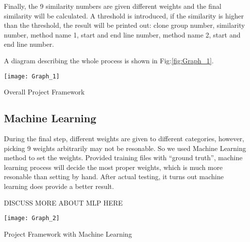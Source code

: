 \documentclass[../main.tex]{subfiles}
\begin{document}
Finally, the 9 similarity numbers are given different weights and the final similarity will be calculated. A threshold is introduced, if the similarity is higher than the threshold, the result will be printed out: clone group number, similarity number, method name 1, start and end line number, method name 2, start and end line number.

A diagram describing the whole process is shown in Fig:\ref{fig:Graph_1}.\\

\begin{figurehere}
\centering \texttt{[image: Graph\_1]} 
\caption{Overall Project Framework} \label{fig:Graph_1}
\end{figurehere}

\subsection{Machine Learning}

During the final step, different weights are given to different categories, however, picking 9 weights arbitrarily may not be resonable. So we used Machine Learning method to set the weights. Provided training files with ``ground truth'', machine learning process will decide the most proper weights, which is much more resonable than setting by hand. After actual testing, it turns out machine learning does provide a better result.

DISCUSS MORE ABOUT MLP HERE\\

\begin{figurehere}
\centering \texttt{[image: Graph\_2]} 
\caption{Project Framework with Machine Learning} \label{fig:Graph_2}
\end{figurehere}
\end{document}
